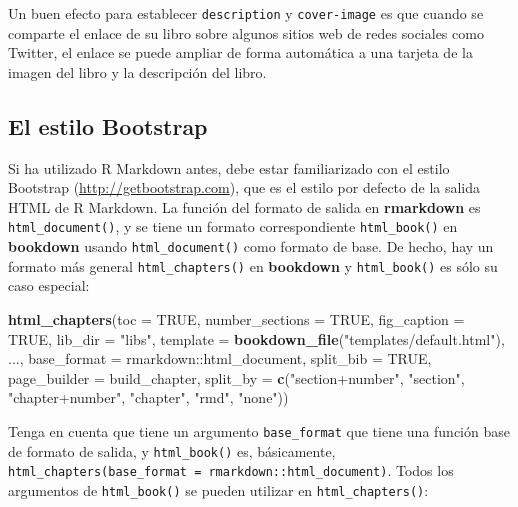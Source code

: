 \documentclass[12pt,]{krantz}
\makeatletter
\newenvironment{Shaded}{\begin{snugshade}}{\end{snugshade}}
\newcommand{\KeywordTok}[1]{\textcolor[rgb]{0.13,0.29,0.53}{\textbf{{#1}}}}
\newcommand{\DataTypeTok}[1]{\textcolor[rgb]{0.13,0.29,0.53}{{#1}}}
\newcommand{\StringTok}[1]{\textcolor[rgb]{0.31,0.60,0.02}{{#1}}}
\newcommand{\OtherTok}[1]{\textcolor[rgb]{0.56,0.35,0.01}{{#1}}}
\newcommand{\NormalTok}[1]{{#1}}
\newenvironment{kframe}{%
\medskip{}
\setlength{\fboxsep}{.8em}
 \def\at@end@of@kframe{}%
 \ifinner\ifhmode%
  \def\at@end@of@kframe{\end{minipage}}%
  \begin{minipage}{\columnwidth}%
 \fi\fi%
 \def\FrameCommand##1{\hskip\@totalleftmargin \hskip-\fboxsep
 \colorbox{shadecolor}{##1}\hskip-\fboxsep
     \hskip-\linewidth \hskip-\@totalleftmargin \hskip\columnwidth}%
 \MakeFramed {\advance\hsize-\width
   \@totalleftmargin\z@ \linewidth\hsize
   \@setminipage}}%
 {\par\unskip\endMakeFramed%
 \at@end@of@kframe}
\renewenvironment{Shaded}{\begin{kframe}}{\end{kframe}}
\theoremstyle{definition}
\theoremstyle{definition}
\theoremstyle{remark}
\makeatother
\begin{document}
Un buen efecto para establecer \texttt{description} y
\texttt{cover-image} es que cuando se comparte el enlace de su libro
sobre algunos sitios web de redes sociales como Twitter, el enlace se
puede ampliar de forma automática a una tarjeta de la imagen del libro y
la descripción del libro.

\subsection{El estilo Bootstrap}\label{el-estilo-bootstrap}

Si ha utilizado R Markdown antes, debe estar familiarizado con el estilo
Bootstrap (\url{http://getbootstrap.com}), que es el estilo por defecto
de la salida HTML de R Markdown. La función del formato de salida en
\textbf{rmarkdown} es \texttt{html\_document()}, y se tiene un formato
correspondiente \texttt{html\_book()} en \textbf{bookdown} usando
\texttt{html\_document()} como formato de base. De hecho, hay un formato
más general \texttt{html\_chapters()} en \textbf{bookdown} y
\texttt{html\_book()} es sólo su caso especial:

\begin{Shaded}
\begin{Highlighting}[]
\KeywordTok{html_chapters}\NormalTok{(}\DataTypeTok{toc =} \OtherTok{TRUE}\NormalTok{, }\DataTypeTok{number_sections =} \OtherTok{TRUE}\NormalTok{, }\DataTypeTok{fig_caption =} \OtherTok{TRUE}\NormalTok{, }
  \DataTypeTok{lib_dir =} \StringTok{"libs"}\NormalTok{, }\DataTypeTok{template =} \KeywordTok{bookdown_file}\NormalTok{(}\StringTok{"templates/default.html"}\NormalTok{), }
  \NormalTok{..., }\DataTypeTok{base_format =} \NormalTok{rmarkdown::html_document, }\DataTypeTok{split_bib =} \OtherTok{TRUE}\NormalTok{, }
  \DataTypeTok{page_builder =} \NormalTok{build_chapter, }\DataTypeTok{split_by =} \KeywordTok{c}\NormalTok{(}\StringTok{"section+number"}\NormalTok{, }
    \StringTok{"section"}\NormalTok{, }\StringTok{"chapter+number"}\NormalTok{, }\StringTok{"chapter"}\NormalTok{, }\StringTok{"rmd"}\NormalTok{, }\StringTok{"none"}\NormalTok{))}
\end{Highlighting}
\end{Shaded}

Tenga en cuenta que tiene un argumento \texttt{base\_format} que tiene
una función base de formato de salida, y \texttt{html\_book()} es,
básicamente,
\texttt{html\_chapters(base\_format\ =\ rmarkdown::html\_document)}.
Todos los argumentos de \texttt{html\_book()} se pueden utilizar en
\texttt{html\_chapters()}:
\end{document}
